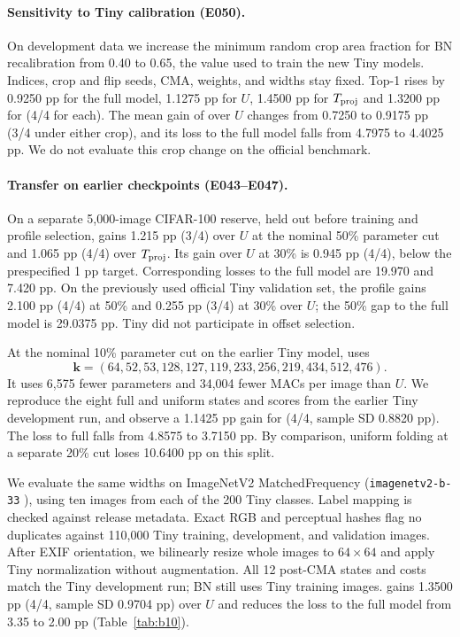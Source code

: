 

\paragraph{Sensitivity to Tiny calibration (E050).}
On development data we increase the minimum random crop area fraction
for BN recalibration from 0.40 to 0.65, the value used to train the new
Tiny models. Indices, crop and flip seeds, CMA, weights, and widths stay
fixed. Top-1 rises by 0.9250 pp for the full model, 1.1275 pp for $U$,
1.4500 pp for $T_{\rm proj}$ and 1.3200 pp for \FrozenShort{} (4/4 for
each). The mean gain of \FrozenShort{} over $U$ changes from 0.7250 to
0.9175 pp (3/4 under either crop), and its loss to the full model falls
from 4.7975 to 4.4025 pp. We do not evaluate this crop change on the
official benchmark.
\FloatBarrier

\paragraph{Transfer on earlier checkpoints (E043--E047).}
On a separate 5,000-image CIFAR-100 reserve, held out before training
and profile selection, \FrozenShort{} gains 1.215 pp (3/4) over $U$ at
the nominal 50\% parameter cut and 1.065 pp (4/4) over $T_{\rm proj}$.
Its gain over $U$ at 30\% is 0.945 pp (4/4), below the prespecified 1 pp
target. Corresponding losses to the full model are 19.970 and 7.420 pp.
On the previously used official Tiny validation set, the profile gains
2.100 pp (4/4) at 50\% and 0.255 pp (3/4) at 30\% over $U$; the 50\% gap
to the full model is 29.0375 pp. Tiny did not participate in offset selection.

At the nominal 10\% parameter cut on the earlier Tiny model, \FrozenShort{} uses
\[
 \mathbf k=(64,52,53,128,127,119,233,256,219,434,512,476).
\]
It uses 6,575 fewer parameters and 34,004 fewer MACs per image than
$U$. We reproduce
the eight full and uniform states and scores from the earlier Tiny
development run, and observe a 1.1425 pp gain for \FrozenShort{} (4/4,
sample SD 0.8820 pp). The loss to full falls from 4.8575 to 3.7150 pp.
By comparison, uniform folding at a separate 20\% cut loses 10.6400 pp
on this split.

We evaluate the same widths on ImageNetV2 MatchedFrequency
(\texttt{imagenetv2-b-33} \citep{recht2019imagenetv2}), using ten images
from each of the 200 Tiny classes. Label mapping is checked against
release metadata. Exact RGB and perceptual hashes flag no duplicates
against 110,000 Tiny training, development, and validation images. After
EXIF orientation, we bilinearly resize whole images to $64\times64$ and
apply Tiny normalization without augmentation. All 12 post-CMA states
and costs match the Tiny development run; BN still uses Tiny training
images. \FrozenShort{} gains 1.3500 pp (4/4, sample SD 0.9704 pp) over
$U$ and reduces the loss to the full model from 3.35 to 2.00 pp
(Table~\ref{tab:b10}).

